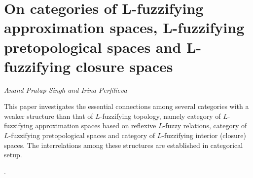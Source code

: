 \documentclass[../booklet.tex]{subfiles}
\begin{document}
\section[On categories of L-fuzzifying approximation spaces, L-fuzzifying pretopological spaces and L-fuzzifying closure spaces. {\it Anand Pratap Singh and Irina Perfilieva}]{On categories of L-fuzzifying approximation spaces, L-fuzzifying pretopological spaces and L-fuzzifying closure spaces}
 

\begin{center}
  {\it Anand Pratap Singh and Irina Perfilieva}
\end{center}

\vskip 0.8cm


This paper investigates the essential connections among several categories with a weaker structure than that of $L$-fuzzifying topology, namely category of $L$-fuzzifying approximation spaces based on reflexive $L$-fuzzy relations, category of $L$-fuzzifying pretopological spaces and category of $L$-fuzzifying interior (closure) spaces. The interrelations among these structures are established in categorical setup.

.
\end{document}
